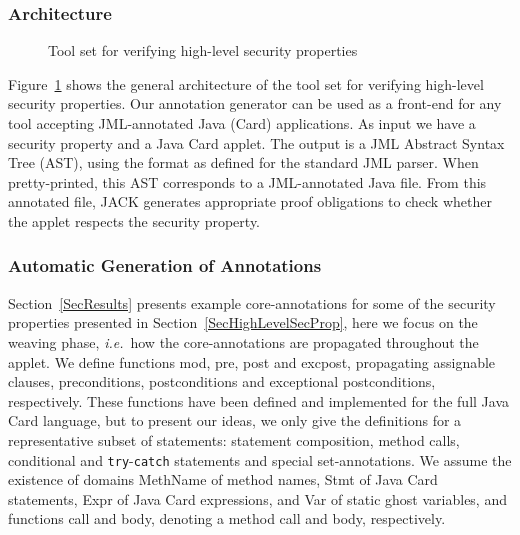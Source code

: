 \subsubsection{Architecture}

\begin{figure}[p]
\begin{center}
\end{center}
\caption{Tool set for verifying high-level security properties}\label{FigArch}
\end{figure}



Figure~\ref{FigArch} shows the general architecture of the tool set
for verifying high-level security properties. Our annotation generator
can be used as a front-end for any tool accepting JML-annotated Java
(Card) applications. As input we have a security property and a Java
Card applet. The output is a JML Abstract Syntax Tree (AST), using the
format as defined for the standard JML parser. When pretty-printed,
this AST corresponds to a JML-annotated Java file. From this
annotated file, JACK generates appropriate proof obligations to check
whether the applet respects the security property.

\subsubsection{Automatic Generation of Annotations}

Section~\ref{SecResults} presents example core-annotations for some of
the security properties presented in
Section~\ref{SecHighLevelSecProp}, here we focus on the weaving phase,
\emph{i.e.}~how the core-annotations are propagated throughout the
applet. We define functions \textsf{mod}, \textsf{pre}, \textsf{post} and
\textsf{exc\-post}, propagating assignable clauses, preconditions, 
postconditions and exceptional postconditions, respectively. These
functions have been defined and implemented for the full Java Card
language, but to present our ideas, we only give the definitions for a
representative subset of statements: statement composition, method
calls, conditional and \texttt{try}-\texttt{catch} statements and
special set-annotations. We assume the existence of domains
\textsf{MethName} of method names, \textsf{Stmt} of Java Card
statements, \textsf{Expr} of Java Card expressions, and \textsf{Var}
of static ghost variables, and functions
\textsf{call} and \textsf{body}, denoting a method call and 
body, respectively.

